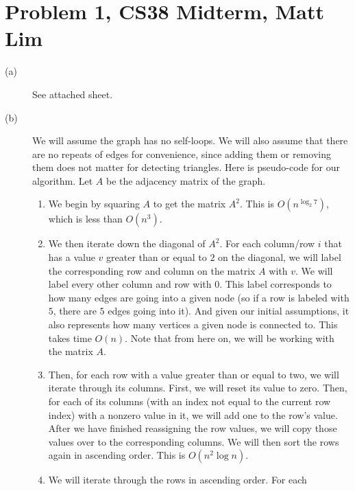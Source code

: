\documentclass{article}
\begin{document}
\section*{Problem 1, CS38 Midterm, Matt Lim}
\begin{description}
    \item[(a)]
        See attached sheet.
    \item[(b)]
        We will assume the graph has no self-loops. We will also assume that
        there are no repeats of edges for convenience, since adding
        them or removing them does not matter for detecting triangles.
        Here is pseudo-code for our algorithm. Let $A$ be the adjacency matrix
        of the graph.
        \begin{enumerate}
            \item
                We begin by squaring $A$ to get the matrix $A^2$. This is
                $O(n^{\log _2 7})$, which is less than $O(n^3)$.
            \item
                We then iterate down the diagonal of $A^2$. For each column/row
                $i$ that has a value $v$ greater than or equal to $2$ on the
                diagonal, we will label the corresponding row and column on the
                matrix $A$ with $v$. We will label every other column and row
                with $0$. This label corresponds to how many edges are going
                into a given node (so if a row is labeled with $5$,  there are
                $5$ edges going into it). And given our initial assumptions, it
                also represents how many vertices a given node is connected to.
                This takes time $O(n)$. Note that from here on, we
                will be working with the matrix $A$.
            \item Then, for each row with a value greater than or equal to two, we will iterate
                through its columns. First, we will reset its value to zero.
                Then, for each of its columns (with an index not equal to
                the current row index) with a nonzero value in it, we will
                add one to the row's value. After we have finished reassigning
                the row values, we will copy those values over to the
                corresponding columns. We will then sort the rows
                again in ascending order. This is $O(n^2\log n)$.
            \item
                We will iterate through the rows in ascending order. For each

\end{enumerate}
\end{description}
\end{document}
